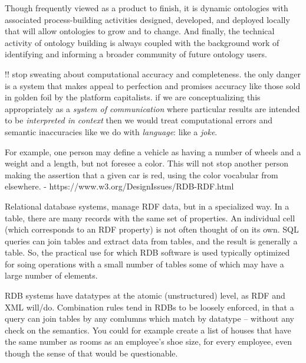 \documentclass[10pt]{article}
\begin{document}
\begin{multicols}{2}
\begin{leftbar}
Though frequently viewed as a product to finish, it is dynamic
ontologies with associated process-building activities designed,
developed, and deployed locally that will allow ontologies to grow and
to change. And finally, the technical activity of ontology building is
always coupled with the background work of identifying and informing a
broader community of future ontology users. \cite{bowkerInformationInfrastructureStudies2010} 
\end{leftbar}

!! stop sweating about computational accuracy and completeness. the only
danger is a system that makes appeal to perfection and promises accuracy
like those sold in golden foil by the platform capitalists. if we are
conceptualizing this appropriately as a \emph{system of communication}
where particular results are intended to be \emph{interpreted in
context} then we would treat computational errors and semantic
inaccuracies like we do with \emph{language}: like a \emph{joke}.

\begin{leftbar}
For example, one person may define a vehicle as having a number of
wheels and a weight and a length, but not foresee a color. This will not
stop another person making the assertion that a given car is red, using
the color vocabular from elsewhere. -
https://www.w3.org/DesignIssues/RDB-RDF.html
\end{leftbar}

\begin{leftbar}
Relational database systems, manage RDF data, but in a specialized way.
In a table, there are many records with the same set of properties. An
individual cell (which corresponds to an RDF property) is not often
thought of on its own. SQL queries can join tables and extract data from
tables, and the result is generally a table. So, the practical use for
which RDB software is used typically optimized for soing operations with
a small number of tables some of which may have a large number of
elements.

RDB systems have datatypes at the atomic (unstructured) level, as RDF
and XML will/do. Combination rules tend in RDBs to be loosely enforced,
in that a query can join tables by any comlumns which match by datatype
-- without any check on the semantics. You could for example create a
list of houses that have the same number as rooms as an employee's shoe
size, for every employee, even though the sense of that would be
questionable.


\end{leftbar}
\end{multicols}
\end{document}
